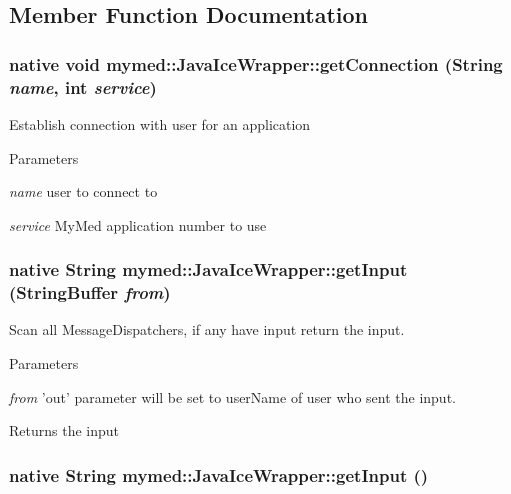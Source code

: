 \subsection{Member Function Documentation}
\hypertarget{classmymed_1_1JavaIceWrapper_acbc9014ee604c6dfbec6e1f3c1f4500e}{
\subsubsection[{getConnection}]{\setlength{\rightskip}{0pt plus 5cm}native void mymed::JavaIceWrapper::getConnection (String {\em name}, \/  int {\em service})}}
\label{classmymed_1_1JavaIceWrapper_acbc9014ee604c6dfbec6e1f3c1f4500e}
Establish connection with user for an application 
\begin{DoxyParams}{Parameters}
\item[{\em name}]user to connect to \item[{\em service}]MyMed application number to use \end{DoxyParams}
\hypertarget{classmymed_1_1JavaIceWrapper_a8a950610ddf0c69e287f6d1702b97387}{
\subsubsection[{getInput}]{\setlength{\rightskip}{0pt plus 5cm}native String mymed::JavaIceWrapper::getInput (StringBuffer {\em from})}}
\label{classmymed_1_1JavaIceWrapper_a8a950610ddf0c69e287f6d1702b97387}
Scan all MessageDispatchers, if any have input return the input. 
\begin{DoxyParams}{Parameters}
\item[{\em from}]'out' parameter will be set to userName of user who sent the input. \end{DoxyParams}
\begin{DoxyReturn}{Returns}
the input 
\end{DoxyReturn}
\hypertarget{classmymed_1_1JavaIceWrapper_a800d9af066725c394979d86aabb10ba8}{
\subsubsection[{getInput}]{\setlength{\rightskip}{0pt plus 5cm}native String mymed::JavaIceWrapper::getInput ()}}
